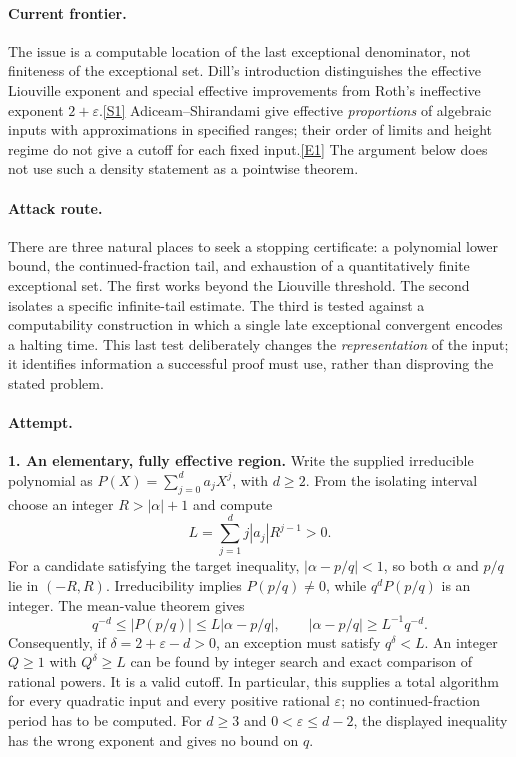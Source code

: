 \documentclass[11pt,a4paper]{article}
\newcommand{\eps}{\varepsilon}
\newcommand{\sref}[2]{\hyperlink{source:#1:#2}{[S#2]}}
\newcommand{\eref}[2]{\hyperlink{extra:#1:#2}{[E#2]}}
\begin{document}
\paragraph{Current frontier.}
The issue is a computable location of the last exceptional denominator, not
finiteness of the exceptional set. Dill's introduction distinguishes the
effective Liouville exponent and special effective improvements from Roth's
ineffective exponent $2+\eps$.\sref{30006790}{1} Adiceam--Shirandami give effective
\emph{proportions} of algebraic inputs with approximations in specified
ranges; their order of limits and height regime do not give a cutoff for
each fixed input.\eref{30006790}{1} The argument below does not use such a density
statement as a pointwise theorem.

\paragraph{Attack route.}
There are three natural places to seek a stopping certificate: a polynomial
lower bound, the continued-fraction tail, and exhaustion of a quantitatively
finite exceptional set. The first works beyond the Liouville threshold.
The second isolates a specific infinite-tail estimate. The third is tested
against a computability construction in which a single late exceptional
convergent encodes a halting time. This last test deliberately changes the
\emph{representation} of the input; it identifies information a successful
proof must use, rather than disproving the stated problem.

\paragraph{Attempt.}
\textbf{1. An elementary, fully effective region.}
Write the supplied irreducible polynomial as
$P(X)=\sum_{j=0}^{d}a_jX^j$, with $d\ge2$.
From the isolating interval choose an integer $R>|\alpha|+1$ and compute
\[
 L=\sum_{j=1}^{d}j|a_j|R^{j-1}>0.
\]
For a candidate satisfying the target inequality, $|\alpha-p/q|<1$,
so both $\alpha$ and $p/q$ lie in $(-R,R)$. Irreducibility implies
$P(p/q)\ne0$, while $q^dP(p/q)$ is an integer. The mean-value theorem gives
\begin{equation}\label{30006790:liouville}
 q^{-d}\le |P(p/q)|\le L|\alpha-p/q|,
 \qquad |\alpha-p/q|\ge L^{-1}q^{-d}.
\end{equation}
Consequently, if $\delta=2+\eps-d>0$, an exception must satisfy
$q^\delta<L$. An integer $Q\ge1$ with $Q^\delta\ge L$ can be found by
integer search and exact comparison of rational powers. It is a valid
cutoff. In particular, this supplies a total algorithm for every quadratic
input and every positive rational $\eps$; no continued-fraction period has
to be computed. For $d\ge3$ and $0<\eps\le d-2$, the displayed inequality
has the wrong exponent and gives no bound on $q$.
\end{document}
